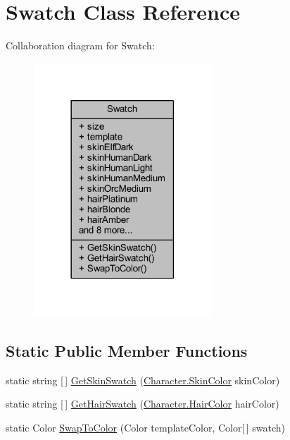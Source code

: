 \hypertarget{class_swatch}{}\section{Swatch Class Reference}
\label{class_swatch}


Collaboration diagram for Swatch\+:\nopagebreak
\begin{figure}[H]
\begin{center}
\leavevmode
\includegraphics[width=189pt]{class_swatch__coll__graph}
\end{center}
\end{figure}
\subsection*{Static Public Member Functions}
\begin{DoxyCompactItemize}
\item 
static string \mbox{[}$\,$\mbox{]} \mbox{\hyperlink{class_swatch_aad8681cfc4c7902a684220e08e67b00b}{Get\+Skin\+Swatch}} (\mbox{\hyperlink{class_character_a726214a0fe480fffada7772697764824}{Character.\+Skin\+Color}} skin\+Color)
\item 
static string \mbox{[}$\,$\mbox{]} \mbox{\hyperlink{class_swatch_ad9aee8913b15b1cd21e4d734aeb00f6b}{Get\+Hair\+Swatch}} (\mbox{\hyperlink{class_character_a7940fffce9bfadb9e7abf15490cf8bb0}{Character.\+Hair\+Color}} hair\+Color)
\item 
static Color \mbox{\hyperlink{class_swatch_aa6e64b48c8403d88179beb90da11c2f8}{Swap\+To\+Color}} (Color template\+Color, Color\mbox{[}$\,$\mbox{]} swatch)
\end{DoxyCompactItemize}
